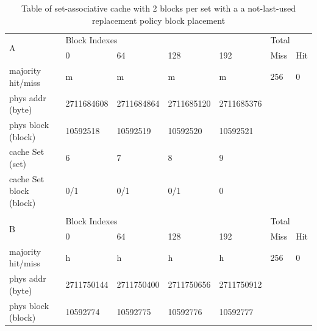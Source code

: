 \documentclass[12pt]{article}
\begin{document}
\begin{table}[H]
\centering
\caption{Table of set-associative cache with 2 blocks per set with a a not-last-used replacement policy block placement}
\begin{tabular}{lllllll}
\multicolumn{1}{l|}{\multirow{2}{*}{A}}      & \multicolumn{4}{l|}{Block Indexes}                                     & \multicolumn{2}{l}{Total} \\
\multicolumn{1}{l|}{}                        & 0          & 64         & 128        & \multicolumn{1}{l|}{192}        & Miss         & Hit         \\ \hline
\multicolumn{1}{l|}{majority hit/miss}       & m          & m          & m          & \multicolumn{1}{l|}{m}          & 256          & 0           \\
\multicolumn{1}{l|}{phys addr (byte)}        & 2711684608 & 2711684864 & 2711685120 & \multicolumn{1}{l|}{2711685376} &              &             \\
\multicolumn{1}{l|}{phys block (block)}      & 10592518   & 10592519   & 10592520   & \multicolumn{1}{l|}{10592521}   &              &             \\
\multicolumn{1}{l|}{cache Set (set)}         & 6          & 7          & 8          & \multicolumn{1}{l|}{9}          &              &             \\
\multicolumn{1}{l|}{cache Set block (block)} & 0/1        & 0/1        & 0/1        & \multicolumn{1}{l|}{0}          &              &             \\
                                             &            &            &            &                                 &              &             \\
\multicolumn{1}{l|}{\multirow{2}{*}{B}}      & \multicolumn{4}{l|}{Block Indexes}                                     & \multicolumn{2}{l}{Total} \\
\multicolumn{1}{l|}{}                        & 0          & 64         & 128        & \multicolumn{1}{l|}{192}        & Miss         & Hit         \\ \hline
\multicolumn{1}{l|}{majority hit/miss}       & h          & h          & h          & \multicolumn{1}{l|}{h}          & 256          & 0           \\
\multicolumn{1}{l|}{phys addr (byte)}        & 2711750144 & 2711750400 & 2711750656 & \multicolumn{1}{l|}{2711750912} &              &             \\
\multicolumn{1}{l|}{phys block (block)}      & 10592774   & 10592775   & 10592776   & \multicolumn{1}{l|}{10592777}   &              &             \\

\end{tabular}
\end{table}
\end{document}
